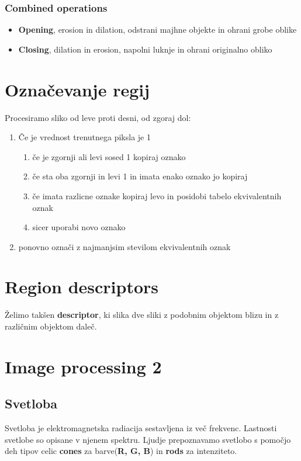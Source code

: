 \documentclass[11pt]{article}
\begin{document}
\subsubsection*{Combined operations}
\begin{itemize}
\item \textbf{Opening}, erosion in dilation, odstrani majhne objekte in ohrani grobe oblike
\item \textbf{Closing}, dilation in erosion, napolni luknje in ohrani originalno obliko
\end{itemize}

\newpage

\section{Ozna\v{c}evanje regij}
Procesiramo sliko od leve proti desni, od zgoraj dol:
\begin{enumerate}
\item \v{C}e je vrednost trenutnega piksla je 1
\begin{enumerate}
\item \v{c}e je zgornji ali levi sosed 1 kopiraj oznako
\item \v{c}e sta oba zgornji in levi 1 in imata enako oznako jo kopiraj
\item \v{c}e imata razlicne oznake kopiraj levo in posidobi tabelo ekvivalentnih oznak
\item sicer uporabi novo oznako
\end{enumerate}
\item ponovno ozna\v{c}i z najmanjsim stevilom ekvivalentnih oznak
\end{enumerate}

\section{Region descriptors}
\v{Z}elimo tak\v{s}en \textbf{descriptor}, ki slika dve sliki z podobnim objektom blizu in z razli\v{c}nim objektom dale\v{c}.

\section{Image processing 2}

\subsection{Svetloba}
Svetloba je elektromagnetska radiacija sestavljena iz ve\v{c} frekvenc. Lastnosti svetlobe so opisane v njenem spektru. Ljudje prepoznavamo svetlobo s pomo\v{c}jo deh tipov celic \textbf{cones} za barve(\textbf{R, G, B}) in \textbf{rods} za intenziteto.
\end{document}

